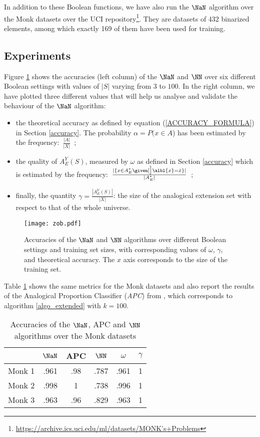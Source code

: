 \documentclass{ecai}
\begin{document}
In addition to these Boolean functions, we have also run the $\NaN$ algorithm
over the Monk datasets over the UCI
repository\footnote{\href{https://archive.ics.uci.edu/ml/datasets/MONK's+Problems}{https://archive.ics.uci.edu/ml/datasets/MONK's+Problems}}.
They are datasets of 432 binarized elements, among which exactly 169 of them
have been used for training.

\subsection{Experiments}

Figure \ref{plots} shows the accuracies (left column) of the $\NaN$ and $\NN$
over six different Boolean settings with values of $|S|$ varying from $3$ to
$100$. In the right column, we have plotted three different values that will
help us analyse and validate the behaviour of the
$\NaN$ algorithm:
\begin{itemize}
  \item the theoretical accuracy as defined by equation
    (\ref{ACCURACY_FORMULA})
    in Section \ref{accuracy}. The probability $\alpha = P(x \in A$) has been
    estimated by the frequency:~$\frac{|A|}{|X|}$~;
  \item the quality of $A_E^Y(S)$, measured by $\omega$ as defined in Section
    \ref{accuracy} which is estimated by the frequency:~$\frac{|\{x \in A_E^*
    \given[\big] \albl{x} = \dot{x}\}|}{|A_E^*|}$~;
\item finally, the
    quantity $\gamma = \frac{|A_E^Y(S)|}{|X|}$: the size of
    the analogical extension set with respect to that of the whole universe.
\end{itemize}

\begin{figure}[h!]
\caption{Accuracies of the $\NaN$ and $\NN$ algorithms  over different Boolean
  settings and training set sizes, with corresponding values of $\omega$,
  $\gamma$, and theoretical accuracy. The $x$ axis corresponds to the size of
the training set.}
\label{plots}
\texttt{[image: zob.pdf]}
\end{figure}

Table \ref{TABLE_MONK} shows the same metrics for the Monk datasets and
also report the results of the Analogical Proportion Classifier (\textit{APC})
from \cite{MicBayDelJAIR2008}, which corresponds to algorithm
\ref{algo_extended} with $k=100$.

\begin{table}
\centering
\caption{Accuracies of the $\NaN$, APC and $\NN$ algorithms over the Monk datasets}
\label{TABLE_MONK}
\begin{tabular}{| c | c | c | c | c | c |}
\toprule
& $\NaN$  & APC & $\NN$  &  $\omega$ & $\gamma$ \\
\midrule
Monk 1 & .961 & .98 & .787 &   .961    &   1 \\
Monk 2 & .998 & 1 & .738 &    .996    &   1 \\
Monk 3 & .963 & .96 & .829 &   .963    &   1 \\
\bottomrule
\end{tabular}
\end{table}
\end{document}
